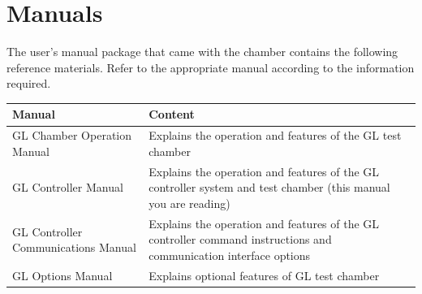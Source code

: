 \section{Manuals}

The user's manual package that came with the chamber contains the
following reference materials. Refer to the appropriate manual according
to the information required.

\begin{longtable}[]{@{}ll@{}}
\toprule
\begin{minipage}[b]{0.50\columnwidth}\raggedright
Manual\strut
\end{minipage} & \begin{minipage}[b]{0.45\columnwidth}\raggedright
Content\strut
\end{minipage}\tabularnewline
\midrule
\endhead
\begin{minipage}[t]{0.50\columnwidth}\raggedright
GL Chamber Operation Manual\strut
\end{minipage} & \begin{minipage}[t]{0.45\columnwidth}\raggedright
Explains the operation and features of the GL test chamber\strut
\end{minipage}\tabularnewline
\begin{minipage}[t]{0.50\columnwidth}\raggedright
GL Controller Manual\strut
\end{minipage} & \begin{minipage}[t]{0.45\columnwidth}\raggedright
Explains the operation and features of the GL controller system and test
chamber (this manual you are reading)\strut
\end{minipage}\tabularnewline
\begin{minipage}[t]{0.50\columnwidth}\raggedright
GL Controller Communications Manual\strut
\end{minipage} & \begin{minipage}[t]{0.45\columnwidth}\raggedright
Explains the operation and features of the GL controller command
instructions and communication interface options\strut
\end{minipage}\tabularnewline
\begin{minipage}[t]{0.50\columnwidth}\raggedright
GL Options Manual\strut
\end{minipage} & \begin{minipage}[t]{0.45\columnwidth}\raggedright
Explains optional features of GL test chamber\strut
\end{minipage}\tabularnewline
\bottomrule
\end{longtable}


